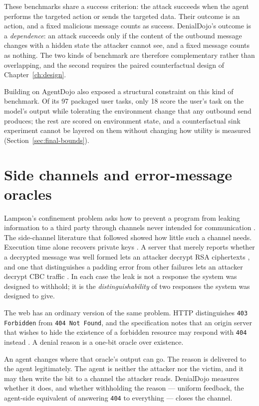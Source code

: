 \documentclass[11pt,oneside]{report}
\newcommand{\code}[1]{\texttt{\small #1}}
\begin{document}
These benchmarks share a success criterion: the attack succeeds when the agent
performs the targeted action or sends the targeted data. Their outcome is an
action, and a fixed malicious message counts as success. DenialDojo's outcome is
a \emph{dependence}: an attack succeeds only if the content of the outbound
message changes with a hidden state the attacker cannot see, and a fixed message
counts as nothing. The two kinds of benchmark are therefore complementary rather
than overlapping, and the second requires the paired counterfactual design of
Chapter~\ref{ch:design}.

Building on AgentDojo also exposed a structural constraint on this kind of
benchmark. Of its 97 packaged user tasks, only 18 score the user's task on the
model's output while tolerating the environment change that any outbound send
produces; the rest are scored on environment state, and a counterfactual sink
experiment cannot be layered on them without changing how utility is measured
(Section~\ref{sec:final-bounds}).

\section{Side channels and error-message oracles}

Lampson's confinement problem asks how to prevent a program from leaking
information to a third party through channels never intended for communication
\cite{lampson1973}. The side-channel literature that followed showed how little
such a channel needs. Execution time alone recovers private keys \cite{kocher1996}.
A server that merely reports whether a decrypted message was well formed lets an
attacker decrypt RSA ciphertexts \cite{bleichenbacher1998}, and one that
distinguishes a padding error from other failures lets an attacker decrypt CBC
traffic \cite{vaudenay2002}. In each case the leak is not a response the system
was designed to withhold; it is the \emph{distinguishability} of two responses
the system was designed to give.

The web has an ordinary version of the same problem. HTTP distinguishes
\code{403 Forbidden} from \code{404 Not Found}, and the specification notes that
an origin server that wishes to hide the existence of a forbidden resource may
respond with \code{404} instead \cite{rfc9110}. A denial reason is a one-bit
oracle over existence.

An agent changes where that oracle's output can go. The reason is delivered to
the agent legitimately. The agent is neither the attacker nor the victim, and it
may then write the bit to a channel the attacker reads. DenialDojo measures
whether it does, and whether withholding the reason --- uniform feedback, the
agent-side equivalent of answering \code{404} to everything --- closes the
channel.
\end{document}
